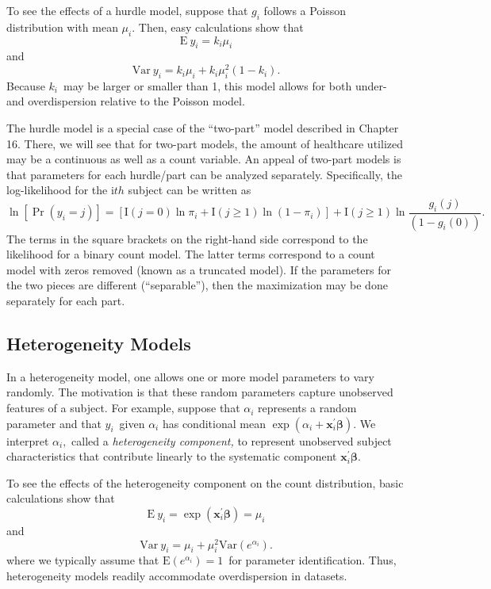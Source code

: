 {To see the effects of a hurdle model, suppose that $g_i$ follows a
Poisson distribution with mean $\mu_i$. Then, easy calculations show
that
\begin{equation*}
\mathrm{E~} y_i =k_i \mu_i
\end{equation*}
and%
\begin{equation*}
\mathrm{Var~} y_i = k_i \mu_i + k_i \mu_i^2(1-k_i).
\end{equation*}
Because $k_i$\ may be larger or smaller than 1, this model allows
for both under- and overdispersion relative to the Poisson model.

The hurdle model is a special case of the ``two-part'' model
described in Chapter 16. There, we will see that for two-part
models, the amount of healthcare utilized may be a continuous as
well as a count variable. An appeal of two-part models is that
parameters for each hurdle/part can be analyzed separately.
Specifically, the log-likelihood for the i$th$ subject can be
written as
\begin{equation*}
\ln \left[ \Pr \left( y_i=j\right) \right] =\left[
\mathrm{I}(j=0)\ln \pi_i+\mathrm{I}(j\geq 1)\ln (1-\pi_i)\right]
+\mathrm{I}(j\geq 1)\ln \frac{g_i(j)}{(1-g_i(0))}.
\end{equation*}%
The terms in the square brackets on the right-hand side correspond
to the likelihood for a binary count model. The latter terms
correspond to a count model with zeros removed (known as a truncated
model). If the parameters for the two pieces are different
(``separable''), then the maximization may be done separately for
each part.

\subsection{Heterogeneity Models}

In a heterogeneity model, one allows one or more model parameters to
vary randomly. The motivation is that these random parameters
capture unobserved features of a subject. For example, suppose that
$\alpha_i$ represents a random parameter and that $y_i$\ given
$\alpha_i$ has conditional mean $ \exp \left(
\alpha_i+\mathbf{x}_i^{\prime}\boldsymbol \beta \right) .$ We
interpret $\alpha_i,$ called a \emph{heterogeneity component, }to
represent unobserved subject characteristics that contribute
linearly to the systematic component
$\mathbf{x}_i^{\prime}\boldsymbol \beta$.

To see the effects of the heterogeneity component on the count distribution,
basic calculations show that
\begin{equation*}
\mathrm{E~} y_i = \exp \left( \mathbf{x}_i^{\prime} \boldsymbol
\beta \right) =\mu_i
\end{equation*}
and%
\begin{equation*}
\mathrm{Var~} y_i = \mu_i + \mu_i^2 \mathrm{Var}\left(
e^{\alpha_i}\right) .
\end{equation*}
where we typically assume that $\mathrm{E}\left( e^{\alpha
_i}\right) =1$\ for parameter identification. Thus, heterogeneity
models readily accommodate overdispersion in datasets.

}
